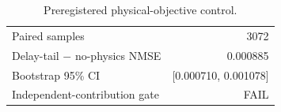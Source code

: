 \begin{table}[t]
\centering
\caption{Preregistered physical-objective control.}
\label{tab:r021}
\begin{tabular}{lr}
\toprule
Paired samples & 3072\\
Delay-tail $-$ no-physics NMSE & 0.000885\\
Bootstrap 95\% CI & [0.000710, 0.001078]\\
Independent-contribution gate & FAIL\\
\bottomrule
\end{tabular}
\end{table}
